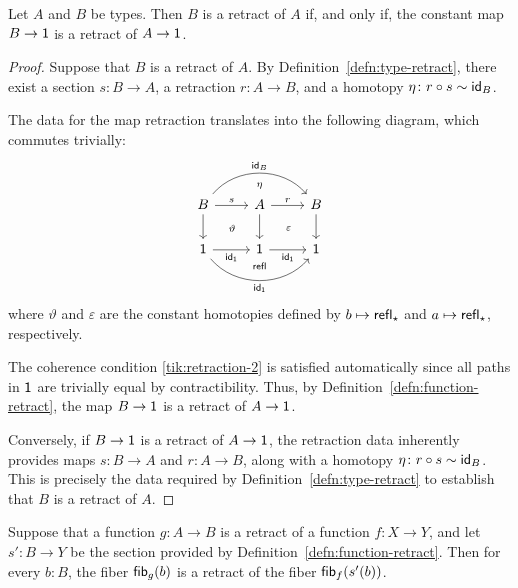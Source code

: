 \begin{prop}
    Let\/ $A$ and\/ $B$ be types. Then\/ $B$ is a retract of\/ $A$ if, and only if, the constant map\/ $B\to\mathsf{1}$ is a retract of\/ $A\to\mathsf{1}$.
\end{prop}

\begin{proof}
    Suppose that $B$ is a retract of $A$. By Definition~\ref{defn:type-retract}, there exist a section $s\colon B\to A$, a retraction $r\colon A\to B$, and a homotopy $\eta\colon r\circ s\sim\id_B$.

    The data for the map retraction translates into the following diagram, which commutes trivially:
    \[
        \begin{tikzcd}
            B
                \arrow[rr, "\scriptstyle\eta"', phantom, bend left=30]
                \arrow[rr, "\id_B", bend left=50]
                \arrow[r, "s"]
                \arrow[d]
                \arrow[rd, phantom, "\scriptstyle\vartheta"]
            & A
                \arrow[rd, phantom, "\scriptstyle\varepsilon"]
                \arrow[r, "r"]
                \arrow[d]
            & B
                \arrow[d] \\
            \fun1
                \arrow[r, "\id_{\fun1}"']
                \arrow[rr, "\scriptstyle\fun{refl}"', phantom, bend right=25]
                \arrow[rr, "\id_{\fun1}"', bend right=50]
            & \fun1
                \arrow[r, "\id_{\fun1}"']
            & \fun1
        \end{tikzcd}
    \]
    where $\vartheta$ and $\varepsilon$ are the constant homotopies defined by $b\mapsto\mathsf{refl}_{\mathsf{\star}}$ and $a\mapsto\mathsf{refl}_{\mathsf{\star}}$, respectively.

    The coherence condition \eqref{tik:retraction-2} is satisfied automatically since all paths in $\mathsf{1}$ are trivially equal by contractibility. Thus, by Definition~\ref{defn:function-retract}, the map $B\to\mathsf{1}$ is a retract of $A\to\mathsf{1}$.

    Conversely, if $B\to\mathsf{1}$ is a retract of $A\to\mathsf{1}$, the retraction data inherently provides maps $s\colon B\to A$ and $r\colon A\to B$, along with a homotopy $\eta\colon r\circ s\sim\id_B$. This is precisely the data required by Definition~\ref{defn:type-retract} to establish that $B$ is a retract of $A$.
\end{proof}

\begin{lem}\label{lem:retract-fib}
    Suppose that a function\/ $g\colon A\to B$ is a retract of a function\/ $f\colon X\to Y$, and let\/ $s'\colon B\to Y$ be the section provided by\/ {\upshape Definition~\ref{defn:function-retract}}. Then for every\/ $b\colon B$, the fiber\/ $\mathsf{fib}_g(b)$ is a retract of the fiber\/ $\mathsf{fib}_f(s'(b))$.
\end{lem}

